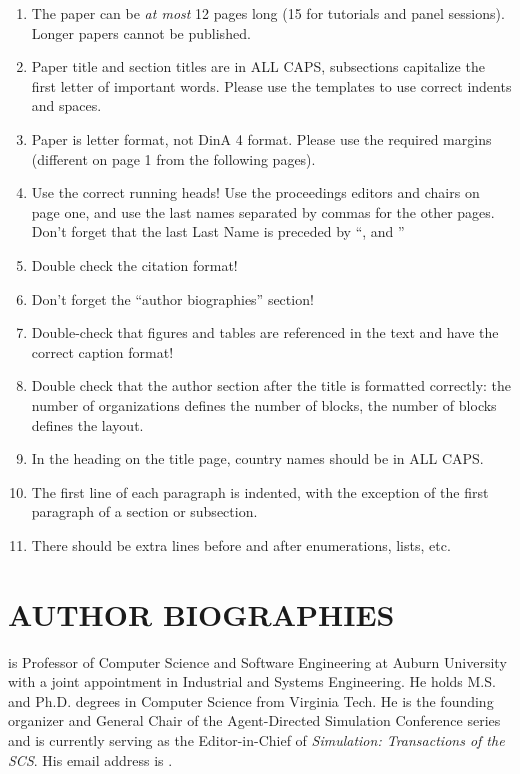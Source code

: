 \documentclass{wscpaperproc}
\theoremstyle{wsc}
\begin{document}
\begin{enumerate}
\item   The paper can be \textit{at most} 12 pages long (15 for tutorials and panel sessions). Longer papers cannot be published.
\item	Paper title and section titles are in ALL CAPS, subsections capitalize the first letter of important words. Please use the templates to use correct indents and spaces.
\item	Paper is letter format, not DinA 4 format. Please use the required margins (different on page 1 from the following pages).
\item	Use the correct running heads! Use the proceedings editors and chairs on page one, and use the last names separated by commas for the other pages. Don't forget that the last Last Name is preceded by ``, and ''
\item	Double check the citation format!
\item	Don't forget the ``author biographies'' section!
\item	Double-check that figures and tables are referenced in the text and have the correct caption format!
\item	Double check that the author section after the title is formatted correctly: the number of organizations defines the number of blocks, the number of blocks defines the layout.
\item	In the heading on the title page, country names should be in ALL CAPS.
\item	The first line of each paragraph is indented, with the exception of the first paragraph of a section or subsection.
\item	There should be extra lines before and after enumerations, lists, etc.
\end{enumerate}




\section*{AUTHOR BIOGRAPHIES}

 is Professor of Computer Science and Software Engineering at Auburn University with a joint appointment in Industrial and Systems Engineering. He holds M.S. and Ph.D. degrees in Computer Science from Virginia Tech. He is the founding organizer and General Chair of the Agent-Directed Simulation Conference series and is currently serving as the Editor-in-Chief of \textit{Simulation: Transactions of the SCS}. His email address is . \\
\end{document}
